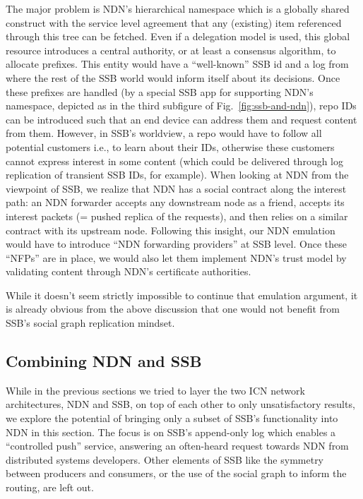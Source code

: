 \documentclass[9pt,sigconf]{acmart}
\begin{document}
The major problem is NDN's hierarchical namespace which is a globally
shared construct with the service level agreement that any (existing)
item referenced through this tree can be fetched.  Even if a
delegation model is used, this global resource introduces a central
authority, or at least a consensus algorithm, to allocate
prefixes. This entity would have a ``well-known'' SSB id and a log
from where the rest of the SSB world would inform itself about its
decisions. Once these prefixes are handled (by a special SSB app for
supporting NDN's namespace, depicted as  in the
third subfigure of Fig.~\ref{fig:ssb-and-ndn}), repo IDs can be
introduced such that an end device can address them and request
content from them. However, in SSB's worldview, a repo would have to
follow all potential customers i.e., to learn about their IDs,
otherwise these customers cannot express interest in some content
(which could be delivered through log replication of transient SSB
IDs, for example). When looking at NDN from the viewpoint of SSB, we
realize that NDN has a social contract along the interest path: an NDN
forwarder accepts any downstream node as a friend, accepts its
interest packets (= pushed replica of the requests), and then relies
on a similar contract with its upstream node. Following this insight,
our NDN emulation would have to introduce ``NDN forwarding providers''
at SSB level. Once these ``NFPs'' are in place, we would also let them
implement NDN's trust model by validating content through NDN's
certificate authorities.

While it doesn't seem strictly impossible to continue that emulation
argument, it is already obvious from the above discussion that one
would not benefit from SSB's social graph replication mindset.


\subsection{Combining NDN and SSB}
\label{ssect:combining}

While in the previous sections we tried to layer the two ICN network
architectures, NDN and SSB, on top of each other to only
unsatisfactory results, we explore the potential of bringing only a
subset of SSB's functionality into NDN in this section. The focus is
on SSB's append-only log which enables a ``controlled push'' service,
answering an often-heard request towards NDN from distributed systems
developers. Other elements of SSB like the symmetry between producers
and consumers, or the use of the social graph to inform the routing,
are left out.
\end{document}
